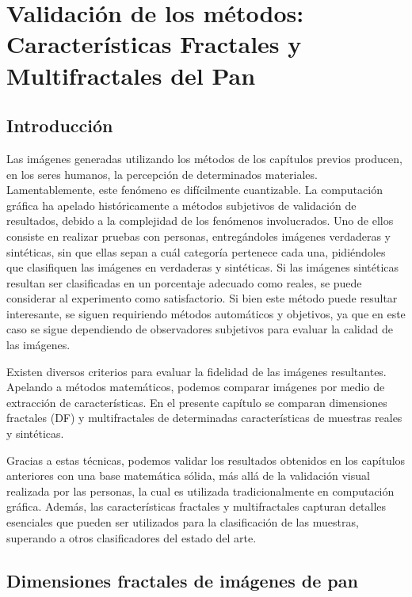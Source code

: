 \chapter[Características Fractales del Pan]{Validación de los métodos: Características Fractales y Multifractales del Pan}

\section{Introducción}


Las imágenes generadas utilizando los métodos de los capítulos previos producen, en los seres humanos, la percepción de determinados materiales.
Lamentablemente, este fenómeno es difícilmente cuantizable.
La computación gráfica ha apelado históricamente a métodos subjetivos de validación de resultados, debido a la complejidad de los fenómenos involucrados.
Uno de ellos consiste en realizar pruebas con personas, entreg\'andoles im\'agenes verdaderas y sint\'eticas, sin que ellas sepan a cu\'al categor\'ia pertenece cada una, pidi\'endoles que clasifiquen las im\'agenes en verdaderas y sint\'eticas.
Si las im\'agenes sint\'eticas resultan ser clasificadas en un porcentaje adecuado como reales, se puede considerar al experimento como satisfactorio.
Si bien este método puede resultar interesante, se siguen requiriendo métodos automáticos y objetivos, ya que en este caso se sigue dependiendo de observadores subjetivos para evaluar la calidad de las imágenes.




Existen diversos criterios para evaluar la fidelidad de las im\'agenes resultantes.
Apelando a métodos matemáticos, podemos comparar imágenes por medio de extracci\'on de caracter\'isticas.
En el presente capítulo se comparan dimensiones fractales (DF) y multifractales de determinadas caracter\'isticas de muestras reales y sint\'eticas.


Gracias a estas t\'ecnicas, podemos validar los resultados obtenidos en los cap\'itulos anteriores con una base matem\'atica s\'olida, m\'as all\'a de la validaci\'on visual realizada por las personas, la cual es utilizada tradicionalmente en computaci\'on gr\'afica.
Además, las características fractales y multifractales capturan detalles esenciales que pueden ser utilizados para la clasificación de las muestras, superando a otros clasificadores del estado del arte.


\section{Dimensiones fractales de imágenes de pan}

